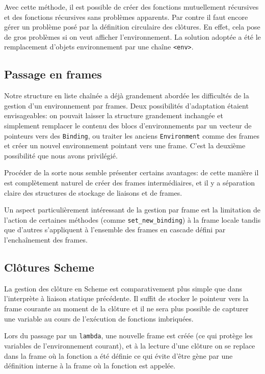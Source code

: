 \documentclass[a4paper,11pt]{article}
\begin{document}
Avec cette méthode, il est possible de créer des fonctions mutuellement
récursives et des fonctions récursives sans problèmes apparents. Par contre il
faut encore gérer un problème posé par la définition circulaire des clôtures.
En effet, cela pose de gros problèmes si on veut afficher l'environnement. La
solution adoptée a été le remplacement d'objets environnement par une chaîne
\texttt{<env>}.

\subsection{Passage en frames}

Notre structure en liste chaînée a déjà grandement abordée les difficultés de la
gestion d'un environnement par frames. Deux possibilités d'adaptation étaient
envisageables: on pouvait laisser la structure grandement inchangée et
simplement remplacer le contenu des blocs d'environnements par un vecteur de
pointeurs vers des \texttt{Binding}, ou traiter les anciens
\texttt{Environment} comme des frames et créer un nouvel environnement pointant
vers une frame. C'est la deuxième possibilité que nous avons privilégié.

Procéder de la sorte nous semble présenter certains avantages: de cette manière
il est complètement naturel de créer des frames intermédiaires, et il y a
séparation claire des structures de stockage de liaisons et de frames.

Un aspect particulièrement intéressant de la gestion par frame est la limitation
de l'action de certaines méthodes (comme \texttt{set\_new\_binding}) à la frame
locale tandis que d'autres s'appliquent à l'ensemble des frames en cascade
défini par l'enchaînement des frames.

\subsection{Clôtures Scheme}

La gestion des clôture en Scheme est comparativement plus simple que dans
l'interprète à liaison statique précédente. Il suffit de stocker le pointeur
vers la frame courante au moment de la clôture et il ne sera plus possible de
capturer une variable au cours de l'exécution de fonctions imbriquées.

Lors du passage par un \texttt{lambda}, une nouvelle frame est créée (ce qui
protège les variables de l'environnement courant), et à la lecture d'une clôture
on se replace dans la frame où la fonction a été définie ce qui évite d'être
gène par une définition interne à la frame où la fonction est appelée.
\end{document}
